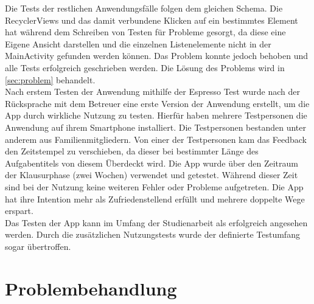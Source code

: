 Die Tests der restlichen Anwendungsfälle folgen dem gleichen Schema. Die RecyclerViews und das damit verbundene Klicken auf ein bestimmtes Element hat während dem Schreiben von Testen für Probleme gesorgt, da diese eine Eigene Ansicht darstellen und die einzelnen Listenelemente nicht in der MainActivity gefunden werden können. Das Problem konnte jedoch behoben und alle Tests erfolgreich geschrieben werden. Die Lösung des Problems wird in \autoref{sec:problem} behandelt.\\
Nach erstem Testen der Anwendung mithilfe der Espresso Test wurde nach der Rücksprache mit dem Betreuer eine erste Version der Anwendung erstellt, um die App durch wirkliche Nutzung zu testen. Hierfür haben mehrere Testpersonen die Anwendung auf ihrem Smartphone installiert. Die Testpersonen bestanden unter anderem aus Familienmitgliedern. Von einer der Testpersonen kam das Feedback den Zeitstempel zu verschieben, da dieser bei bestimmter Länge des Aufgabentitels von diesem Überdeckt wird. Die App wurde über den Zeitraum der Klausurphase (zwei Wochen) verwendet und getestet. Während dieser Zeit sind bei der Nutzung keine weiteren Fehler oder Probleme aufgetreten. Die App hat ihre Intention mehr als Zufriedenstellend erfüllt und mehrere doppelte Wege erspart.\\
Das Testen der App kann im Umfang der Studienarbeit als erfolgreich angesehen werden. Durch die zusätzlichen Nutzungstests wurde der definierte Testumfang sogar übertroffen.

\section{Problembehandlung}\label{sec:problem}